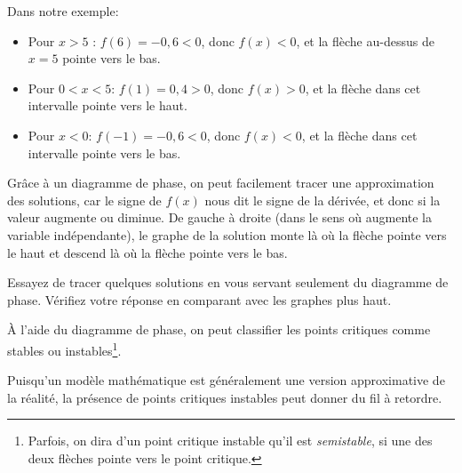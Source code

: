 Dans notre exemple:
\begin{itemize}
	\item Pour $x > 5$ : $f(6) = -0,6 < 0$, donc $f(x) < 0$, et la flèche au-dessus de $x=5$ pointe vers le bas.
	\item Pour $0 < x < 5$: $f(1) = 0,4 > 0$, donc $f(x) > 0$, et la flèche dans cet intervalle pointe vers le haut.
	\item Pour $x <0$: $f(-1) = -0,6 < 0$, donc $f(x) < 0$, et la flèche dans cet intervalle pointe vers le bas.
\end{itemize}

\begin{center}
\end{center}

\pagebreak[0]
Grâce à un diagramme de phase, on peut facilement tracer une approximation des solutions, car le signe de $f(x)$ nous dit le signe de la dérivée, et donc si la valeur augmente ou diminue.
De gauche à droite (dans le sens où augmente la variable indépendante),
le graphe de la solution monte là où la flèche pointe vers le haut et descend là où la flèche pointe vers le bas.

\begin{exercise}
Essayez de tracer quelques solutions en vous servant seulement du diagramme de phase.
Vérifiez votre réponse en comparant avec les graphes plus haut.
\end{exercise}

\pagebreak[0]
À l'aide du diagramme de phase, on peut classifier les points critiques comme stables ou instables$\!$\footnote{Parfois, on dira d'un point critique instable qu'il est \emph{semistable}, si une des deux flèches pointe vers le point critique.}.

\begin{center}
\end{center}

Puisqu'un modèle mathématique est généralement une version approximative de la réalité,
la présence de points critiques instables peut donner du fil à retordre.

